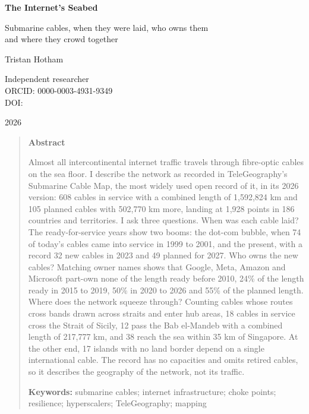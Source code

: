 \documentclass[11pt,a4paper]{article}
\begin{document}
\begin{center}
{\Large\bfseries The Internet's Seabed\par}
\vspace{0.4em}
{\large Submarine cables, when they were laid, who owns them\\and where they crowd together\par}
\vspace{1.2em}
{\large Tristan Hotham\par}
\vspace{0.3em}
{\small Independent researcher\\
ORCID: 0000-0003-4931-9349\\
DOI: \par}
\vspace{0.8em}
2026
\end{center}

\begin{quote}
\small
\begin{center}\textbf{Abstract}\end{center}
Almost all intercontinental internet traffic travels through fibre-optic cables on the sea floor. I describe the network as recorded in TeleGeography's Submarine Cable Map, the most widely used open record of it, in its 2026 version: 608 cables in service with a combined length of 1,592,824 km and 105 planned cables with 502,770 km more, landing at 1,928 points in 186 countries and territories. I ask three questions. When was each cable laid? The ready-for-service years show two booms: the dot-com bubble, when 74 of today's cables came into service in 1999 to 2001, and the present, with a record 32 new cables in 2023 and 49 planned for 2027. Who owns the new cables? Matching owner names shows that Google, Meta, Amazon and Microsoft part-own none of the length ready before 2010, 24\% of the length ready in 2015 to 2019, 50\% in 2020 to 2026 and 55\% of the planned length. Where does the network squeeze through? Counting cables whose routes cross bands drawn across straits and enter hub areas, 18 cables in service cross the Strait of Sicily, 12 pass the Bab el-Mandeb with a combined length of 217,777 km, and 38 reach the sea within 35 km of Singapore. At the other end, 17 islands with no land border depend on a single international cable. The record has no capacities and omits retired cables, so it describes the geography of the network, not its traffic.

\textbf{Keywords:} submarine cables; internet infrastructure; choke points; resilience; hyperscalers; TeleGeography; mapping
\end{quote}
\end{document}
